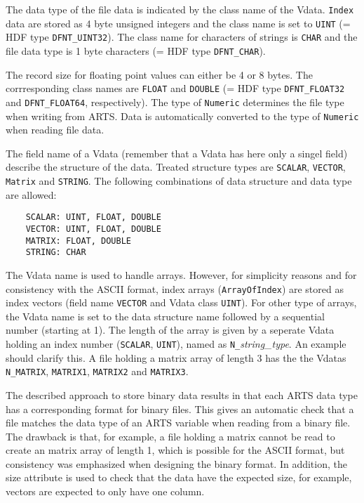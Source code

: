  The data type of the file data is indicated by the class name of the
 Vdata. \verb|Index| data are stored as 4 byte unsigned integers and
 the class name is set to \verb|UINT| (= HDF type \verb|DFNT_UINT32|).
 The class name for characters of strings is \verb|CHAR| and the file
 data type is 1 byte characters (= HDF type \verb|DFNT_CHAR|).

 The record size for floating point values can either be 4 or 8 bytes.
 The corrresponding class names are \verb|FLOAT| and \verb|DOUBLE|
 (= HDF type \verb|DFNT_FLOAT32| and \verb|DFNT_FLOAT64|, respectively).
 The type of \verb|Numeric| determines the file type when writing from
 ARTS. Data is automatically converted to the type of \verb|Numeric|
 when reading file data.
 
 The field name of a Vdata (remember that a Vdata has here only a
 singel field) describe the structure of the data. Treated structure
 types are \verb|SCALAR|, \verb|VECTOR|, \verb|Matrix| and \verb|STRING|.
 The following combinations of data structure and data type are allowed:
 \begin{verbatim}
    SCALAR: UINT, FLOAT, DOUBLE 
    VECTOR: UINT, FLOAT, DOUBLE 
    MATRIX: FLOAT, DOUBLE 
    STRING: CHAR
 \end{verbatim} 
 The Vdata name is used to handle arrays. However, for simplicity
 reasons and for consistency with the ASCII format, index arrays
 (\verb|ArrayOfIndex|) are stored as index vectors (field name
 \verb|VECTOR| and Vdata class \verb|UINT|). For other type of
 arrays, the Vdata name is set to the data structure name followed
 by a sequential number (starting at 1). The length of the array
 is given by a seperate Vdata holding an index number (\verb|SCALAR|,
 \verb|UINT|), named as \verb|N_|{\it string\_type}. An example should
 clarify this. A file holding a matrix array of length 3 has the
 the Vdatas \verb|N_MATRIX|, \verb|MATRIX1|, \verb|MATRIX2| and
 \verb|MATRIX3|.

 The described approach to store binary data results in that each
 ARTS data type has a corresponding format for binary files. This 
 gives an automatic check that a file matches the data type of
 an ARTS variable when reading from a binary file. The drawback
 is that, for example, a file holding a matrix cannot be read to create
 an matrix array of length 1, which is possible for the ASCII format,
 but consistency was emphasized when designing the binary format.
 In addition, the size attribute is used to check that the data
 have the expected size, for example, vectors are expected to only
 have one column.
 

